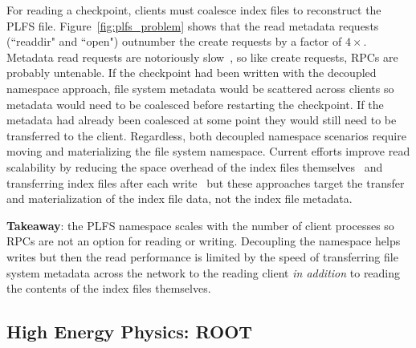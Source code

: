 For reading a checkpoint, clients must coalesce index files to reconstruct the
PLFS file. Figure~\ref{fig:plfs_problem} shows that the read metadata requests
(``readdir" and ``open") outnumber the create requests by a factor of
\(4\times\). Metadata read requests are notoriously
slow~\cite{carns:ipdps09-pvfs, eshel:fast10-panache}, so like create requests,
RPCs are probably untenable. If the checkpoint had been written with the
decoupled namespace approach, file system metadata would be scattered across
clients so metadata would need to be coalesced before restarting the
checkpoint. If the metadata had already been coalesced at some point they would
still need to be transferred to the client. Regardless, both decoupled
namespace scenarios require moving and materializing the file system namespace.
Current efforts improve read scalability by reducing the space overhead of the
index files themselves~\cite{he:hpdc13-plfs-patterns} and transferring index
files after each write~\cite{grider:pc17-diddlings} but these approaches target
the transfer and materialization of the index file data, not the index file
metadata.

\textbf{Takeaway}: the PLFS namespace scales with the number of client
processes so RPCs are not an option for reading or writing.  Decoupling the
namespace helps writes but then the read performance is limited by the speed of
transferring file system metadata across the network to the reading client {\it
in addition} to reading the contents of the index files themselves.

\vspace{-0.5em}
\subsection{High Energy Physics: ROOT}
\label{sec:hep}
\vspace{-0.5em}


